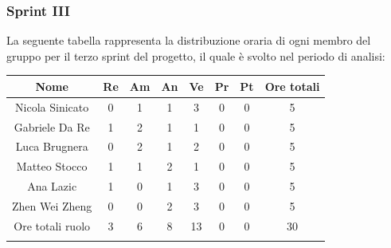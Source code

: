 %
\newpage
\subsubsection{Sprint III}
%
La seguente tabella rappresenta la distribuzione oraria di ogni membro del gruppo per il terzo sprint del progetto, il quale è svolto nel periodo di analisi:

	\setlength\extrarowheight{5pt}
	\begin{tabularx}{\textwidth}{|ccccccc|c|}
		\hline
		\rowcolor{white}
		\textbf{Nome} & \textbf{Re} & \textbf{Am} & \textbf{An} & \textbf{Ve} & \textbf{Pr}& \textbf{Pt} & \textbf{Ore totali} \\
		\hline
		Nicola Sinicato &0&1&1&3&0&0&5 \\
		Gabriele Da Re &1&2&1&1&0&0&5 \\
		Luca Brugnera &0&2&1&2&0&0&5 \\
		Matteo Stocco &1&1&2&1&0&0&5 \\
		Ana Lazic &1&0&1&3&0&0&5 \\
		Zhen Wei Zheng &0&0&2&3&0&0&5 \\
		\hline
		Ore totali ruolo &3&6&8&13&0&0&30 \\
		\hline
		\rowcolor{white}
		\caption{Distribuzione oraria durante il terzo sprint per ruolo e persona}
	\end{tabularx}
	\vspace{10pt}
	
